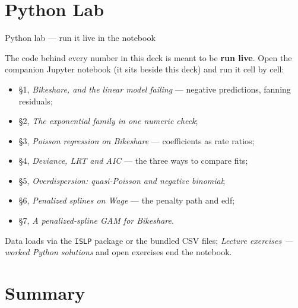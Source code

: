 \documentclass[aspectratio=169,11pt]{beamer}
\begin{document}
\section{Python Lab}

\begin{frame}{Python lab --- run it live in the notebook}
  \begin{labnote}
    The code behind every number in this deck is meant to be \textbf{run live}.
    Open the companion Jupyter notebook (it sits beside this deck) and run it
    cell by cell:
    \begin{itemize}
      \item \S1, \emph{Bikeshare, and the linear model failing} --- negative predictions, fanning residuals;
      \item \S2, \emph{The exponential family in one numeric check};
      \item \S3, \emph{Poisson regression on Bikeshare} --- coefficients as rate ratios;
      \item \S4, \emph{Deviance, LRT and AIC} --- the three ways to compare fits;
      \item \S5, \emph{Overdispersion: quasi-Poisson and negative binomial};
      \item \S6, \emph{Penalized splines on Wage} --- the penalty path and edf;
      \item \S7, \emph{A penalized-spline GAM for Bikeshare}.
    \end{itemize}
    Data loads via the \texttt{ISLP} package or the bundled CSV files;
    \emph{Lecture exercises --- worked Python solutions} and open exercises end
    the notebook.
  \end{labnote}
\end{frame}

\section{Summary}
\end{document}
